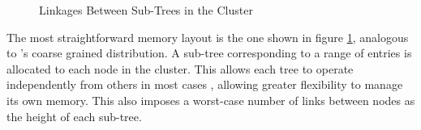 \newcommand{\clusternode}[1]{
	\tikzset{>={Stealth[length=1.25mm]}}
	\draw ({(#1)*6}, 0) ++(-2.75, 0.5) rectangle ++(5.5, -3);
	\node[tree] at ({(#1)*6}, 0) (n#1 00) {};
	\foreach \r [
		evaluate = \r as \w using int(3^\r),
		evaluate = \r as \wl using int(3^\r-1)
	] in {1,...,2} {
		\foreach \c [
			evaluate = \c as \i using int((\w-1)/2 + \c-1),
			evaluate = \c as \pr using int(\r-1),
			evaluate = \c as \pc using int(\c/3),
			evaluate = \c as \cl using int(\c-1)
		] in {0,...,\wl} {
			\node[tree] (n#1 \r\c)
				at ({(#1)*6 + (\c-int(\w/2)) / (\w/5)}, -\r) {};
			\draw[->] (n#1 \pr\pc) -- (n#1 \r\c);
			\ifthenelse{\c=0}{}{
				\draw[->] (n#1 \r\cl) -- (n#1 \r\c);
			}
		}
	}
}

\begin{figure}
	\centering
	\caption{Linkages Between Sub-Trees in the Cluster}
\label{coarse-link}
\end{figure}

The most straightforward memory layout is the one shown in figure
\ref{coarse-link}, analogous to \citeauthor{base}'s coarse grained distribution.
A sub-tree corresponding to a range of entries is allocated to each node in the
cluster. This allows each tree to operate independently from others in most
cases \autocite{ma-tpds-2022}, allowing greater flexibility to manage its own
memory. This also imposes a worst-case number of links between nodes as the
height of each sub-tree.
